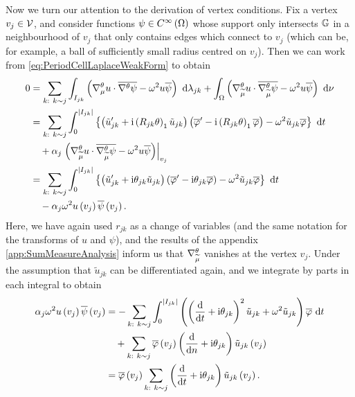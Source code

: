 Now we turn our attention to the derivation of vertex conditions.
Fix a vertex $v_j\in \mathcal{V}$, and consider functions $\psi\in C^{\infty}\left( \Omega \right)$ whose support only intersects $\mathbb{G}$ in a neighbourhood of $v_j$ that only contains edges which connect to $v_j$ (which can be, for example, a ball of sufficiently small radius centred on $v_j$).
Then we can work from \eqref{eq:PeriodCellLaplaceWeakForm} to obtain
\begin{align*}
	0 &= \sum_{k: \ k\sim j} \int_{I_{jk}} \left(  \nabla^{\theta}_\mu u \cdot \overline{\nabla^{\theta}\psi} - \omega^2 u\overline{\psi}  \right)  \ \mathrm{d}\lambda_{jk} 
	+ \int_{\Omega} \left(  \nabla^{\theta}_{\widetilde{\mu}}u\cdot\overline{\nabla^{\theta}_{\widetilde{\mu}}\psi}-\omega^2 u\overline{\psi}  \right)  \ \mathrm{d}\nu \\
	&= \sum_{k: \ k\sim j} \int_{0}^{\left\lvert I_{jk} \right\rvert} \left\{  \left( \tilde{u}_{jk}' + \mathrm{i}\left( R_{jk}\theta \right)_1 \tilde{u}_{jk} \right)\left( \overline{\varphi}' - \mathrm{i}\left( R_{jk}\theta \right)_1 \overline{\varphi}  \right) - \omega^2 \tilde{u}_{jk}\overline{\varphi}  \right\} \ \mathrm{d} t \\
	&\quad + \alpha_j\left.\left(  \nabla^{\theta}_{\widetilde{\mu}}u\cdot\overline{\nabla^{\theta}_{\widetilde{\mu}}\psi}-\omega^2 u\overline{\psi}  \right)\right\vert_{v_j} \\
	&= \sum_{k: \ k\sim j} \int_{0}^{\left\lvert I_{jk} \right\rvert} \left\{  \left( \tilde{u}_{jk}' + \mathrm{i}\theta_{jk} \tilde{u}_{jk} \right)\left( \overline{\varphi}' - \mathrm{i}\theta_{jk} \overline{\varphi}  \right) - \omega^2 \tilde{u}_{jk}\overline{\varphi}  \right\} \ \mathrm{d} t \\
	&\quad - \alpha_j \omega^2 u\left( v_j \right)\overline{\psi}\left( v_j \right).
\end{align*}
Here, we have again used $r_{jk}$ as a change of variables (and the same notation for the transforms of $u$ and $\psi$), and the results of the appendix \ref{app:SumMeasureAnalysis} inform us that $\nabla^{\theta}_{\widetilde{\mu}}$ vanishes at the vertex $v_j$.
Under the assumption that $\tilde{u}_{jk}$ can be differentiated again, and we integrate by parts in each integral to obtain
\begin{align*}
	\alpha_j\omega^2 u\left( v_j \right)\overline{\psi}\left( v_j \right) 
	&= - \sum_{k: \ k\sim j} \int_{0}^{\left\lvert I_{jk} \right\rvert} \left(  \left( \dfrac{\mathrm{d}}{\mathrm{d}t} + \mathrm{i}\theta_{jk} \right)^2 \tilde{u}_{jk} +\omega^2 \tilde{u}_{jk}  \right)\overline{\varphi} \ \mathrm{d} t \\
	&\quad + \sum_{k: \ k\sim j}\overline{\varphi}\left( v_j \right)\left( \dfrac{\mathrm{d}}{\mathrm{d}n} + \mathrm{i}\theta_{jk} \right)\tilde{u}_{jk}\left( v_j \right) \\
	&= \overline{\varphi}\left( v_j \right)\sum_{k: \ k\sim j}\left( \dfrac{\mathrm{d}}{\mathrm{d}t} + \mathrm{i}\theta_{jk} \right)\tilde{u}_{jk}\left( v_j \right).
\end{align*}
